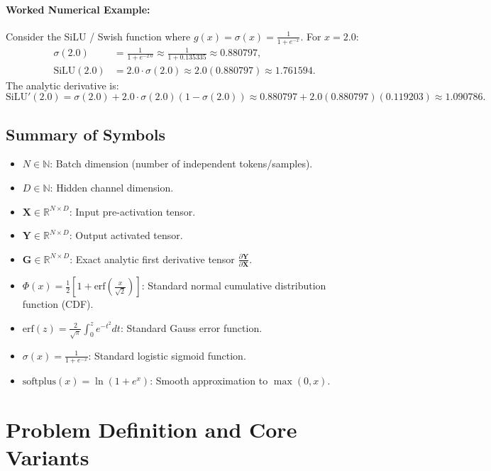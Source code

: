 \documentclass[11pt]{article}
\begin{document}
\paragraph{Worked Numerical Example:}
Consider the SiLU / Swish function where $g(x) = \sigma(x) = \frac{1}{1 + e^{-x}}$.
For $x = 2.0$:
\begin{align}
\sigma(2.0) &= \frac{1}{1 + e^{-2.0}} \approx \frac{1}{1 + 0.135335} \approx 0.880797, \\
\text{SiLU}(2.0) &= 2.0 \cdot \sigma(2.0) \approx 2.0(0.880797) \approx 1.761594.
\end{align}
The analytic derivative is:
\begin{equation}
\text{SiLU}'(2.0) = \sigma(2.0) + 2.0 \cdot \sigma(2.0)(1 - \sigma(2.0)) \approx 0.880797 + 2.0(0.880797)(0.119203) \approx 1.090786.
\end{equation}

\subsection{Summary of Symbols}
\begin{itemize}
    \item $N \in \mathbb{N}$: Batch dimension (number of independent tokens/samples).
    \item $D \in \mathbb{N}$: Hidden channel dimension.
    \item $\mathbf{X} \in \mathbb{R}^{N \times D}$: Input pre-activation tensor.
    \item $\mathbf{Y} \in \mathbb{R}^{N \times D}$: Output activated tensor.
    \item $\mathbf{G} \in \mathbb{R}^{N \times D}$: Exact analytic first derivative tensor $\frac{\partial \mathbf{Y}}{\partial \mathbf{X}}$.
    \item $\Phi(x) = \frac{1}{2} \left[ 1 + \text{erf}\left(\frac{x}{\sqrt{2}}\right) \right]$: Standard normal cumulative distribution function (CDF).
    \item $\text{erf}(z) = \frac{2}{\sqrt{\pi}} \int_0^z e^{-t^2} dt$: Standard Gauss error function.
    \item $\sigma(x) = \frac{1}{1 + e^{-x}}$: Standard logistic sigmoid function.
    \item $\text{softplus}(x) = \ln(1 + e^x)$: Smooth approximation to $\max(0, x)$.
\end{itemize}

\section{Problem Definition and Core Variants}
\label{sec:problem_definition}
\end{document}

